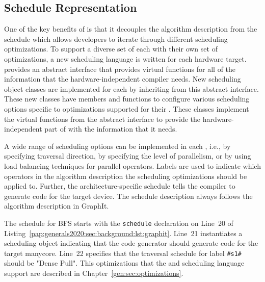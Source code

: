 \subsection{Schedule Representation}
One of the key benefits of \graphit is that it decouples the algorithm description from the schedule which allows developers to iterate through different scheduling optimizations. 
To support a diverse set of \graphvms each with their own set of optimizations, a new scheduling language is written for each hardware target. 
\GG provides an abstract interface that provides virtual functions for all of the information that the hardware-independent compiler needs.
New scheduling object classes are implemented for each \graphvm by inheriting from this abstract interface. 
These new classes have members and functions to configure various scheduling options specific to optimizations supported for their \graphvms. 
These classes implement the virtual functions from the abstract interface to provide the hardware-independent part of \GG with the information that it needs.

A wide range of scheduling options can be implemented in each \graphvm, i.e., by specifying traversal direction, by specifying the level of parallelism, or by using load balancing techniques for parallel operators.
Labels are used to indicate which operators in the algorithm description the scheduling optimizations should be applied to.
Further, the architecture-specific schedule tells the compiler to generate code for the target device.
The schedule description always follows the algorithm description in GraphIt.

The schedule for BFS starts with the \lstinline[language=graphit]{schedule} declaration on Line~20 of Listing~\ref{pap:generals2020:sec:background:lst:graphit}. 
Line~21 instantiates a \hb scheduling object indicating that the code generator should generate code for the target manycore. 
Line~22 specifies that the traversal schedule for label \lstinline[language=graphit]{#s1#} should be "Dense Pull". 
This optimizations that the \hb \graphvm and scheduling language support are described in Chapter~\ref{gen:sec:optimizations}. 

